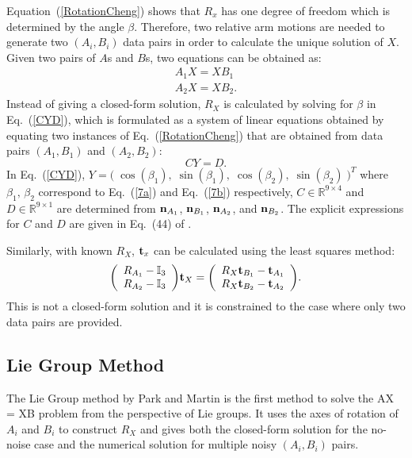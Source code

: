 \documentclass[twocolumn,10pt]{asme2ej}
\newcommand{\nn}{{\bf n}}
\newcommand{\ttt}{{\bf t}}
\begin{document}
Equation~(\ref{RotationCheng}) shows that $R_{x}$ has one degree of freedom which is determined by the angle $\beta$. Therefore, two relative arm motions are needed to generate two $(A_{i}, B_{i})$ data pairs in order to calculate the unique solution of $X$. Given two pairs of $A$s and $B$s, two equations can be obtained as:
\begin{subequations}
\begin{gather}
A_{1}X = XB_{1} \label{7a}\\
A_{2}X = XB_{2}.\label{7b}
\end{gather}
\end{subequations}
Instead of giving a closed-form solution, $R_{X}$ is calculated by solving for $\beta$ in Eq.~(\ref{CYD}), which is formulated as a system of linear equations obtained by equating two instances of Eq.~(\ref{RotationCheng}) that are obtained from data pairs $(A_{1}, B_{1})$ and $(A_{2}, B_{2})$:
\begin{equation}
CY = D.
\label{CYD}
\end{equation}
In Eq.~(\ref{CYD}), $Y = \big( \; \cos(\beta_{1}),\; \sin(\beta_{1}), \; \cos(\beta_{2}),\; 	\sin(\beta_{2}) \;\big)^{T}$ where $\beta_{1}, \, \beta_{2}$ correspond to Eq.~(\ref{7a}) and Eq.~(\ref{7b}) respectively,  $C \in \mathbb{R}^{9 \times 4}$ and $D \in \mathbb{R}^{9 \times 1}$ are determined from $\nn_{A_{1}}$, $\nn_{B_{1}}$, $\nn_{A_{2}}$, and $\nn_{B_{2}}$. The explicit expressions for $C$ and $D$ are given in Eq.~(44) of \cite{shiu1989calibration}.

Similarly, with known $R_{X}$, $\ttt_{x}$ can be calculated using the least squares method:
\begin{equation}
\bigg(\begin{array}{lr}
R_{A_{1}} - \mathbb{I}_{3} \\
R_{A_{2}} - \mathbb{I}_{3}
\end{array}\bigg)\ttt_{X}=
\bigg(\begin{array}{lr}
R_{X}\ttt_{B_{1}} - \ttt_{A_{1}}\\
R_{X}\ttt_{B_{2}} - \ttt_{A_{2}}
\end{array}
\bigg).
\label{trans}
\end{equation}
This is not a closed-form solution and it is constrained to the case where only two data pairs are provided. 

\subsection{Lie Group Method }
The Lie Group method \cite{park1994robot} by Park and Martin is the first method to solve the AX = XB problem from the perspective of Lie groups. It uses the axes of rotation of $A_{i}$ and $B_{i}$ to construct $R_{X}$ and gives both the closed-form solution for the no-noise case and the numerical solution for multiple noisy $(A_{i}, B_{i})$ pairs.
\end{document}
